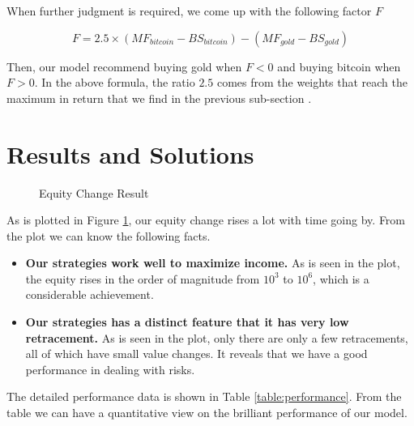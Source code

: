 \documentclass[12pt,a4paper]{article}
\begin{document}
\begin{spacing}{1.2}
When further judgment is required, we come up with the following factor $F$ 

$$
F=2.5 \times (MF_{bitcoin}-BS_{bitcoin})-(MF_{gold}-BS_{gold})
$$

Then, our model recommend buying gold when $F<0$ and buying bitcoin when $F>0$. In the above formula, the ratio $2.5$ comes from the weights that reach the maximum in return that we find in the previous sub-section .

\section{Results and Solutions}
\label{Results_Solutions}

\begin{figure}[H]
	\caption{Equity Change Result}
	\label{figure:equity_change}
\end{figure}

As is plotted in Figure \ref{figure:equity_change}, our equity change rises a lot with time going by. From the plot we can know the following facts.

\begin{itemize}
	\item \textbf{Our strategies work well to maximize income.} As is seen in the plot, the equity rises in the order of magnitude from $10^3$ to $10^6$, which is a considerable achievement.
	
	\item \textbf{Our strategies has a distinct feature that it has very low retracement.} As is seen in the plot, only there are only a few retracements, all of which have small value changes. It reveals that we have a good performance in dealing with risks.
\end{itemize}

The detailed performance data is shown in Table \ref{table:performance}. From the table we can have a quantitative view on the brilliant performance of our model.


\end{spacing}
\end{document}
